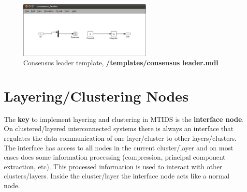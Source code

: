 \documentclass[a4paper,twoside, openright,12pt]{report}
\begin{document}
\begin{figure}[htb]
\centering
\includegraphics[width=0.6\textwidth]{pics/consensus_leader_template.eps}
\caption[MTIDS Consensus Leader Template]{Consensus leader template, \textbf{/templates/consensus leader.mdl}}
\label{templateConsensusLeaderFig}
\end{figure}

%

\section{Layering/Clustering Nodes} \label{layering}


The \textbf{key} to implement layering and clustering in MTIDS is the \textbf{interface node}. On clustered/layered interconnected systems there is always an interface
that regulates the data communication of one layer/cluster to other layers/clusters. The interface has access to all nodes in the current cluster/layer and 
on most cases does some information processing (compression, principal component extraction, etc). This processed information is used to interact with 
other clusters/layers. Inside the cluster/layer the interface node acts like a normal node.
\end{document}
